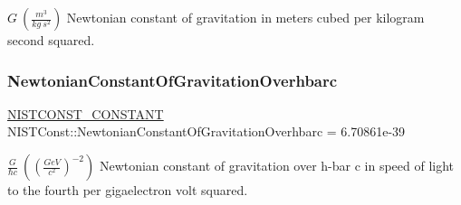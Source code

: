$G \ (\frac{m^3}{kg\ s^2})$ Newtonian constant of gravitation in meters cubed per kilogram second squared. \mbox{\label{group___n_i_s_t_const-_gravitational_constant_gaab8e9e8695add729258bef9e2fc7e9bf}} 
\subsubsection{\texorpdfstring{Newtonian\+Constant\+Of\+Gravitation\+Overhbarc}{NewtonianConstantOfGravitationOverhbarc}}
{\footnotesize\ttfamily \mbox{\hyperlink{group___n_i_s_t_const-_macros_ga2b0fc1d7452373f816175dd86ce26729}{N\+I\+S\+T\+C\+O\+N\+S\+T\+\_\+\+C\+O\+N\+S\+T\+A\+NT}} N\+I\+S\+T\+Const\+::\+Newtonian\+Constant\+Of\+Gravitation\+Overhbarc = 6.\+70861e-\/39}

$\frac{G}{\hbar c} \ ((\frac{GeV}{c^2})^{-2})$ Newtonian constant of gravitation over h-\/bar c in speed of light to the fourth per gigaelectron volt squared. 